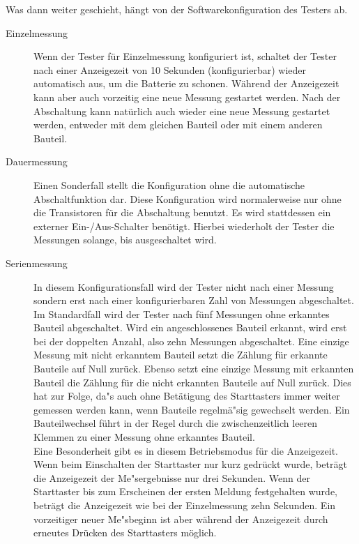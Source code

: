 Was dann weiter geschieht, h\"angt von der Softwarekonfiguration des Testers ab.
\begin{description}
  \item[Einzelmessung] Wenn der Tester f\"ur Einzelmessung konfiguriert ist, schaltet der Tester nach einer Anzeigezeit von 10 Sekunden
(konfigurierbar) wieder automatisch aus, um die Batterie zu schonen. W\"ahrend der Anzeigezeit kann aber
auch vorzeitig eine neue Messung gestartet werden. Nach der Abschaltung kann nat\"urlich auch wieder eine
neue Messung gestartet werden, entweder mit dem gleichen Bauteil oder mit einem anderen Bauteil.\\

  \item[Dauermessung] Einen Sonderfall stellt die Konfiguration ohne die automatische Abschaltfunktion dar.
Diese Konfiguration wird normalerweise nur ohne die Transistoren f\"ur die Abschaltung benutzt.
Es wird stattdessen ein externer Ein-/Aus-Schalter ben\"otigt. Hierbei wiederholt der Tester die
Messungen solange, bis ausgeschaltet wird.\\

  \item[Serienmessung] In diesem Konfigurationsfall wird der Tester nicht nach einer Messung sondern erst nach einer konfigurierbaren
Zahl von Messungen abgeschaltet. Im Standardfall wird der Tester nach f\"unf Messungen ohne erkanntes Bauteil
abgeschaltet. Wird ein angeschlossenes Bauteil erkannt, wird erst bei der doppelten Anzahl, also zehn Messungen abgeschaltet.
Eine einzige Messung mit nicht erkanntem Bauteil setzt die Z\"ahlung f\"ur erkannte Bauteile auf Null zur\"uck.
Ebenso setzt eine einzige Messung mit erkannten Bauteil die Z\"ahlung f\"ur die nicht erkannten Bauteile auf Null zur\"uck.
Dies hat zur Folge, da"s auch ohne Bet\"atigung des Starttasters immer weiter gemessen werden kann,
 wenn Bauteile regelm\"a"sig gewechselt werden.
Ein Bauteilwechsel f\"uhrt in der Regel durch die zwischenzeitlich leeren Klemmen zu einer Messung ohne erkanntes Bauteil.\\

Eine Besonderheit gibt es in diesem Betriebsmodus f\"ur die Anzeigezeit. Wenn beim Einschalten der Starttaster nur kurz
gedr\"uckt wurde, betr\"agt die Anzeigezeit der Me"sergebnisse nur drei Sekunden. Wenn der Starttaster bis zum Erscheinen der
ersten Meldung festgehalten wurde, betr\"agt die Anzeigezeit wie bei der Einzelmessung zehn Sekunden.
Ein vorzeitiger neuer Me"sbeginn ist aber w\"ahrend der Anzeigezeit durch erneutes Dr\"ucken des Starttasters m\"oglich.\\

\end{description}

